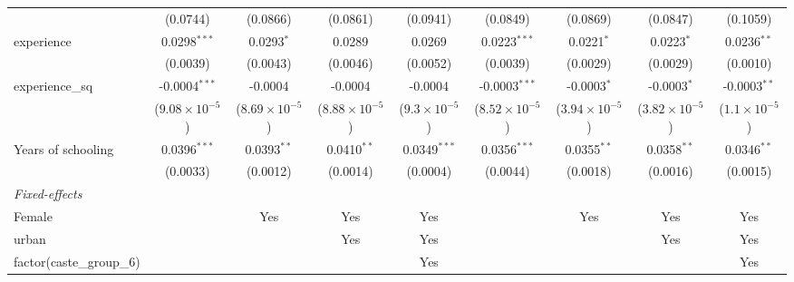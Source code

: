 \begin{table}[htbp]
\begin{tabular}{lcccccccc}
                                & (0.0744)                & (0.0866)                & (0.0861)                & (0.0941)               & (0.0849)                & (0.0869)                & (0.0847)                & (0.1059)\\   
      experience                & 0.0298$^{***}$          & 0.0293$^{*}$            & 0.0289                  & 0.0269                 & 0.0223$^{***}$          & 0.0221$^{*}$            & 0.0223$^{*}$            & 0.0236$^{**}$\\   
                                & (0.0039)                & (0.0043)                & (0.0046)                & (0.0052)               & (0.0039)                & (0.0029)                & (0.0029)                & (0.0010)\\   
      experience\_sq            & -0.0004$^{***}$         & -0.0004                 & -0.0004                 & -0.0004                & -0.0003$^{***}$         & -0.0003$^{*}$           & -0.0003$^{*}$           & -0.0003$^{**}$\\   
                                & ($9.08\times 10^{-5}$)  & ($8.69\times 10^{-5}$)  & ($8.88\times 10^{-5}$)  & ($9.3\times 10^{-5}$)  & ($8.52\times 10^{-5}$)  & ($3.94\times 10^{-5}$)  & ($3.82\times 10^{-5}$)  & ($1.1\times 10^{-5}$)\\    
      Years of schooling        & 0.0396$^{***}$          & 0.0393$^{**}$           & 0.0410$^{**}$           & 0.0349$^{***}$         & 0.0356$^{***}$          & 0.0355$^{**}$           & 0.0358$^{**}$           & 0.0346$^{**}$\\   
                                & (0.0033)                & (0.0012)                & (0.0014)                & (0.0004)               & (0.0044)                & (0.0018)                & (0.0016)                & (0.0015)\\   
      \midrule
      \emph{Fixed-effects}\\
      Female                    &                         & Yes                     & Yes                     & Yes                    &                         & Yes                     & Yes                     & Yes\\  
      urban                     &                         &                         & Yes                     & Yes                    &                         &                         & Yes                     & Yes\\  
      factor(caste\_group\_6)   &                         &                         &                         & Yes                    &                         &                         &                         & Yes\\  

\end{tabular}
\end{table}
